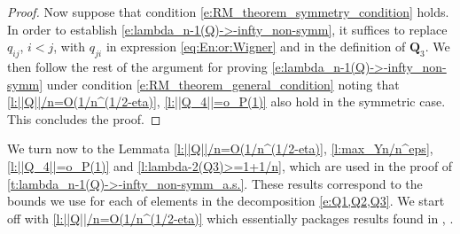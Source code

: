 \documentclass[9pt,twocolumn,twoside]{pnas-new}
\newcommand{\?}{\textbf{?}}
\newcommand{\QQ}{\mathbf{Q}}
\begin{document}
\begin{proof}
Now suppose that condition \eqref{e:RM_theorem_symmetry_condition}
holds. In order to establish \eqref{e:lambda_n-1(Q)->-infty_non-symm},
it suffices to replace $q_{ij}$, $i < j$, with $q_{ji}$ in expression
\eqref{eq:En:or:Wigner} and in the definition of $\QQ_3$.  We then
follow the rest of the argument for proving
\eqref{e:lambda_n-1(Q)->-infty_non-symm} under condition
\eqref{e:RM_theorem_general_condition} noting that
\cref{l:||Q||/n=O(1/n^(1/2-eta)}, \cref{l:||Q_4||=o_P(1)} also hold in
the symmetric case.  This concludes the proof.
\end{proof}



We turn now to the Lemmata \ref{l:||Q||/n=O(1/n^(1/2-eta)},
\ref{l:max_Yn/n^eps}, \ref{l:||Q_4||=o_P(1)} and
\ref{l:lambda-2(Q3)>=1+1/n}, which are used in the proof of
\cref{t:lambda_n-1(Q)->-infty_non-symm_a.s.}.  These results
correspond to the bounds we use for each of elements in the
decomposition \eqref{e:Q1,Q2,Q3}. We start off with
\cref{l:||Q||/n=O(1/n^(1/2-eta)} which essentially packages results
found in \cite{yin:bai:krishnaiah:1988}, \cite{bai:1999}.
\end{document}
